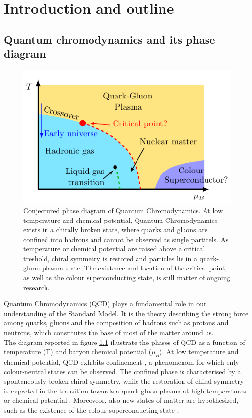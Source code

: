 \chapter{Introduction and outline}
\label{chap:introduction}
\section{Quantum chromodynamics and its phase diagram}
\begin{figure}[h]
    \centering 
    \includegraphics[scale=1.3]{figures/phase_diagram.pdf}
    \caption[The phase diagram of QCD]{Conjectured phase diagram of Quantum Chromodynamics. At low temperature and chemical potential, Quantum Chromodynamics exists in a chirally broken state, where quarks and gluons are confined into hadrons and cannot be observed as single particels. As temperature or chemical potential are raised above a critical treshold, chiral symmetry is restored and particles lie in a quark-gluon plasma state. The existence and location of the critical point, as well as the colour superconducting state, is still matter of ongoing research.}
    \label{fig:QCD_phase_diagram}
\end{figure}
Quantum Chromodynamics (QCD) plays a fundamental role in our understanding of the Standard Model. It is the theory describing the strong force among quarks, gluons and the composition of hadrons such as protons and neutrons, which constitutes the base of most of the matter around us. \\
The diagram reported in figure \ref{fig:QCD_phase_diagram} illustrate the phases of QCD as a function of temperature (T) and baryon chemical potential ($\mu_B$).
At low temperature and chemical potential, QCD exhibits confinement \cite{confinement_wilson,confin}, a phenomenom for which only colour-neutral states can be observed. The confined phase is characterised by a spontaneously broken chiral symmetry, while the restoration of chiral symmetry is expected in the transition towards a quark-gluon plasma at high temperatures or chemical potential \cite{Masayuki1989,Stephanov_1998,Berges_1999,doi:10.1142/S0217751X92001757}. Moreoveor, also new states of matter are hypothesized, such as the existence of the colour superconducting state \cite{colorsuper1,colorsuper2,colorsuper3}. \\
